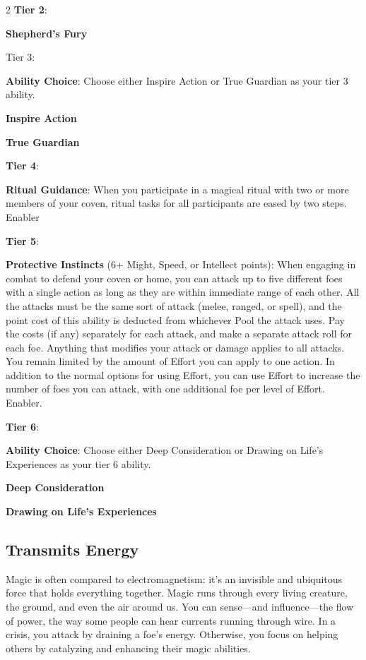 \begin{multicols}{2}
\textbf{Tier 2}:

\textbf{Shepherd’s Fury} 

Tier 3:

\textbf{Ability Choice}: Choose either Inspire Action or True Guardian as your tier 3 ability.

\textbf{Inspire Action}
 
\textbf{True Guardian}

\textbf{Tier 4}:

\textbf{Ritual Guidance}: When you participate in a magical ritual with two or more members of your coven, ritual tasks for all participants are eased by two steps. Enabler

\textbf{Tier 5}:

\textbf{Protective Instincts} (6+ Might, Speed, or Intellect points): When engaging in combat to defend your coven or home, you can attack up to five different foes with a single action as long as they are within immediate range of each other. All the attacks must be the same sort of attack (melee, ranged, or spell), and the point cost of this ability is deducted from whichever Pool the attack uses. Pay the costs (if any) separately for each attack, and make a separate attack roll for each foe. Anything that modifies your attack or damage applies to all attacks. You remain limited by the amount of Effort you can apply to one action. In addition to the normal options for using Effort, you can use Effort to increase the number of foes you can attack, with one additional foe per level of Effort. Enabler.

\textbf{Tier 6}:

\textbf{Ability Choice}: Choose either Deep Consideration or Drawing on Life’s Experiences as your tier 6 ability.

\textbf{Deep Consideration}
 
\textbf{Drawing on Life’s Experiences}

\subsection{Transmits Energy}  
 
Magic is often compared to electromagnetism: it’s an invisible and ubiquitous force that holds everything together. Magic runs through every living creature, the ground, and even the air around us. You can sense—and influence—the flow of power, the way some people can hear currents running through wire. In a crisis, you attack by draining a foe’s energy. Otherwise, you focus on helping others by catalyzing and enhancing their magic abilities.


\end{multicols}
